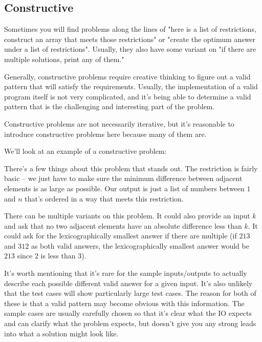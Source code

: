 \subsection{Constructive}

Sometimes you will find problems along the lines of "here is a list of restrictions, construct an array that meets those restrictions" or "create the optimum answer under a list of restrictions". Usually, they also have some variant on "if there are multiple solutions, print any of them."

Generally, constructive problems require creative thinking to figure out a valid pattern that will satisfy the requirements. Usually, the implementation of a valid program itself is not very complicated, and it's being able to determine a valid pattern that is the challenging and interesting part of the problem.

Constructive problems are not necessarily iterative, but it's reasonable to introduce constructive problems here because many of them are.

We'll look at an example of a constructive problem:

\hrulefill



\hrulefill

There's a few things about this problem that stands out. The restriction is fairly basic -- we just have to make sure the minimum difference between adjacent elements is as large as possible. Our output is just a list of numbers between $1$ and $n$ that's ordered in a way that meets this restriction.

There can be multiple variants on this problem. It could also provide an input $k$ and ask that no two adjacent elements have an absolute difference less than $k$. It could ask for the lexicographically smallest answer if there are multiple (if $2 1 3$ and $3 1 2$ as both valid answers, the lexicographically smallest answer would be $2 1 3$ since $2$ is less than $3$).

It's worth mentioning that it's rare for the sample inputs/outputs to actually describe each possible different valid answer for a given input. It's also unlikely that the test cases will show particularly large test cases. The reason for both of these is that a valid pattern may become obvious with this information. The sample cases are usually carefully chosen so that it's clear what the IO expects and can clarify what the problem expects, but doesn't give you any strong leads into what a solution might look like.
